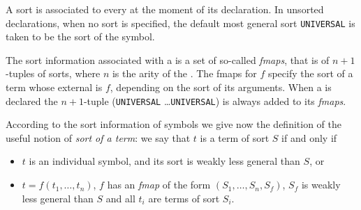 A sort is associated to every {\indsym} at the moment of its declaration.
In unsorted
declarations, when no sort is specified, the default most general sort
{\tt UNIVERSAL} is taken to be the sort of the symbol.

The sort information associated with a {\funsym} is a set of so-called 
{\it fmaps},
that is of $n+1$-tuples of sorts, where $n$ is the arity of the \funconst.
The fmaps for $f$ specify the sort of a term whose external {\funsym} is 
$f$, depending on the sort of its arguments. When a {\funsym} is declared
the $n+1$-tuple ({\tt UNIVERSAL} \ldots {\tt UNIVERSAL}) is always added to its
{\it fmaps}.

According to the sort information of symbols we give now the
definition of the useful notion of {\it sort of a term}:
we say that $t$ is a term of sort $S$ 
if and only if
%
\begin{itemize}
\item
  $t$ is an individual symbol, and its sort is weakly less general than $S$,
  or
\item
  $t=f(t_1,\dots,t_n)$, $f$ has an {\it fmap} of the form $(S_1,\dots,S_n,
  S_f)$, $S_f$ is weakly less general than $S$ and all $t_i$ are terms of sort
  $S_i$.
\end{itemize}
